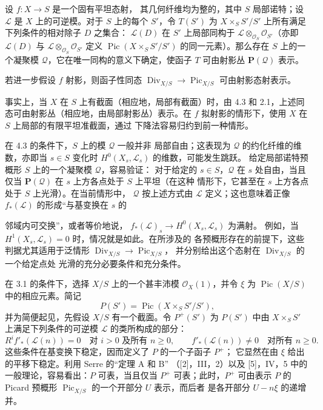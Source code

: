  设 $f:X\longrightarrow S$ 是一个固有平坦态射，
其几何纤维均为整的，其中 $S$ 局部诺特；设 $\mathcal L$ 是 $X$
上的可逆模。对于 $S$ 上的每个 $S'$，令 $T(S')$ 为
$X\times_SS'/S'$ 上所有满足下列条件的相对除子 $D$ 之集合：
$\mathcal L(D)$ 在 $S'$ 上局部同构于
$\mathcal L\otimes_{\mathcal O_S}\mathcal O_{S'}$（亦即
$\mathcal L(D)$ 与
$\mathcal L\otimes_{\mathcal O_S}\mathcal O_{S'}$ 定义
$\operatorname{Pic}(X\times_SS'/S')$ 的同一元素）。那么存在 $S$
上的一个凝聚模 $\mathcal Q$，它在唯一同构的意义下确定，使函子
$T$ 可由射影丛 $\mathbf P(\mathcal Q)$ 表示。

 若进一步假设 $f$ 射影，则函子性同态
$\operatorname{Div}_{X/S}\longrightarrow\operatorname{Pic}_{X/S}$
可由射影态射表示。

事实上，当 $X$ 在 $S$ 上有截面（相应地，局部有截面）时，由 4.3
和 2.1，上述同态可由射影丛（相应地，由局部射影丛）表示。在 $f$
拟射影的情形下，使用 $X$ 在 $S$ 上局部的有限平坦准截面，通过
下降法容易归约到前一种情形。

 在 4.3 的条件下，$S$ 上的模 $\mathcal Q$ 一般并非
局部自由；这表现为 $\mathcal Q$ 的约化纤维的维数，亦即当
$s\in S$ 变化时 $H^0(X_s,\mathcal L_s)$ 的维数，可能发生跳跃。
给定局部诺特预概形 $S$ 上的一个凝聚模 $\mathcal Q$，容易验证：
对于给定的 $s\in S$，$\mathcal Q$ 在 $s$ 处自由，当且仅当
$\mathbf P(\mathcal Q)$ 在 $s$ 上方各点处于 $S$ 上平坦（在这种
情形下，它甚至在 $s$ 上方各点处于 $S$ 上光滑）。在当前情形中，
$\mathcal Q$ 按上述方式由 $\mathcal L$ 定义；这也意味着正像
$f_*(\mathcal L)$ 的形成“与基变换在 $s$ 的

邻域内可交换”，或者等价地说，
$f_*(\mathcal L)_s\longrightarrow H^0(X_s,\mathcal L_s)$ 为满射。
例如，当 $H^1(X_s,\mathcal L_s)=0$ 时，情况就是如此。在所涉及的
各预概形存在的前提下，这些判据尤其适用于泛情形
$\operatorname{Div}_{X/S}\longrightarrow\operatorname{Pic}_{X/S}$，
并分别给出这个态射在 $\operatorname{Div}_{X/S}$ 的一个给定点处
光滑的充分必要条件和充分条件。


在 3.1 的条件下，选择 $X/S$ 上的一个甚丰沛模
$\mathcal O_X(1)$，并令 $\xi$ 为
$\operatorname{Pic}(X/S)$ 中的相应元素。简记
\[
P(S')=\operatorname{Pic}(X\times_SS'/S'),
\]
并为简便起见，先假设 $X/S$ 有一个截面。令 $P^+(S')$ 为
$P(S')$ 中由 $X\times_SS'$ 上满足下列条件的可逆模 $\mathcal L$
的类所构成的部分：
\[
R^if'_*(\mathcal L(n))=0\quad\text{对 $i>0$ 及所有 $n\geq0$},
\qquad
f'_*(\mathcal L(n))\neq0\quad\text{对所有 $n\geq0$}.
\]
这些条件在基变换下稳定，因而定义了 $P$ 的一个子函子 $P^+$；
它显然在由 $\xi$ 给出的平移下稳定。利用 Serre 的“定理 A 和 B”
（[2]，III，2）以及 [5]，IV，5 中的一般理论，容易看出：$P$
可表，当且仅当 $P^+$ 可表；此时，$P^+$ 可由表示 $P$ 的 Picard
预概形 $\operatorname{Pic}_{X/S}$ 的一个开部分 $U$ 表示，而后者
是各开部分 $U-n\xi$ 的递增并。

